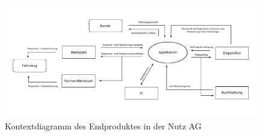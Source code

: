 \begin{center}
  \begin{figure}[ht]
    \includegraphics{graphics/kontextdiagramm.pdf}
    \caption{Kontextdiagramm des Endproduktes in der Nutz AG}
    \label{fig:awesome_image}
  \end{figure}
\end{center}
